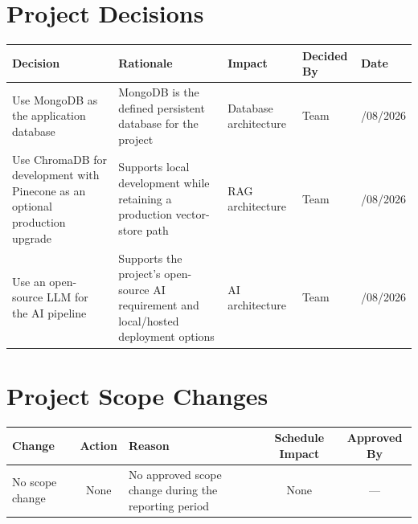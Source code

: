 \documentclass[11pt,a4paper]{article}
\begin{document}
\section{Project Decisions}

\begin{table}[htbp]
\centering
\label{tab:project-decisions}
\renewcommand{\arraystretch}{1.3}
\begin{tabular}{>{\raggedright\arraybackslash}p{3.2cm}
                >{\raggedright\arraybackslash}p{4.0cm}
                >{\raggedright\arraybackslash}p{3.5cm}
                >{\centering\arraybackslash}p{2.0cm}
                >{\centering\arraybackslash}p{1.5cm}}
\toprule
\textbf{Decision} &
\textbf{Rationale} &
\textbf{Impact} &
\textbf{Decided By} &
\textbf{Date} \\
\midrule
Use MongoDB as the application database &
MongoDB is the defined persistent database for the project &
Database architecture &
Team &
20/08/2026 \\

Use ChromaDB for development with Pinecone as an optional production upgrade &
Supports local development while retaining a production vector-store path &
RAG architecture &
Team &
20/08/2026 \\

Use an open-source LLM for the AI pipeline &
Supports the project's open-source AI requirement and local/hosted deployment options &
AI architecture &
Team &
22/08/2026 \\
\bottomrule
\end{tabular}
\end{table}

\section{Project Scope Changes}

\begin{table}[htbp]
\centering
\label{tab:scope-changes}
\renewcommand{\arraystretch}{1.25}
\begin{tabular}{p{3.0cm} c p{3.2cm} c c}
\toprule
\textbf{Change} &
\textbf{Action} &
\textbf{Reason} &
\textbf{Schedule Impact} &
\textbf{Approved By} \\
\midrule
No scope change &
None &
No approved scope change during the reporting period &
None &
--- \\
\bottomrule
\end{tabular}
\end{table}
\end{document}
